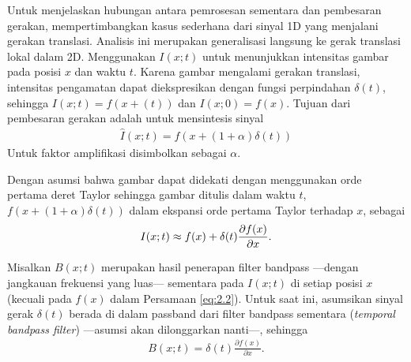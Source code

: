 Untuk menjelaskan hubungan antara pemrosesan sementara dan pembesaran gerakan, \citet{Wu2012} mempertimbangkan kasus sederhana dari sinyal 1D yang menjalani gerakan translasi. Analisis ini merupakan generalisasi langsung ke gerak translasi lokal dalam 2D.
Menggunakan \(I(x; t)\) untuk menunjukkan intensitas gambar pada posisi \(x\) dan waktu \(t\). Karena gambar mengalami gerakan translasi, intensitas pengamatan dapat diekspresikan dengan fungsi perpindahan \(\delta (t)\), sehingga \({I(x; t)  =  f(x  +  (t))}\) dan \({I(x; 0)  =  f(x)}\). Tujuan dari pembesaran gerakan adalah untuk mensintesis sinyal
\begin{equation}\label{eq:2.1}
\begin{aligned}
\hat {I}(x;t) = f(x + (1 + \alpha )\delta (t))
\end{aligned}
\end{equation}
Untuk faktor amplifikasi disimbolkan sebagai \(\alpha \).\newline

Dengan asumsi bahwa gambar dapat didekati dengan menggunakan orde pertama deret Taylor sehingga gambar ditulis dalam waktu \(t\), \(f(x + (1 + \alpha )\delta (t))\) dalam ekspansi orde pertama Taylor terhadap \(x\), sebagai
\begin{equation} \label{eq:2.2}
\begin{aligned}
I(x; t) \approx f(x) + \delta {\rm{(}}t{\rm{)}}\frac{{\partial f(x)}}{{\partial x}}.
\end{aligned}
\end{equation}

Misalkan \(B(x; t)\) merupakan hasil penerapan filter bandpass ---dengan jangkauan frekuensi yang luas--- sementara pada \(I(x; t)\) di setiap posisi \(x\) (kecuali pada \(f(x)\) dalam Persamaan \ref{eq:2.2}). Untuk saat ini, asumsikan sinyal gerak \(\delta (t)\) berada di dalam passband dari filter bandpass sementara (\textit{temporal bandpass filter}) ---asumsi akan dilonggarkan nanti---, sehingga
\begin{equation} \label{eq:2.3}
\begin{aligned}
B(x; t)  = \delta {(t)}\frac{{\partial f(x)}}{{\partial x}}.
\end{aligned}
\end{equation}


